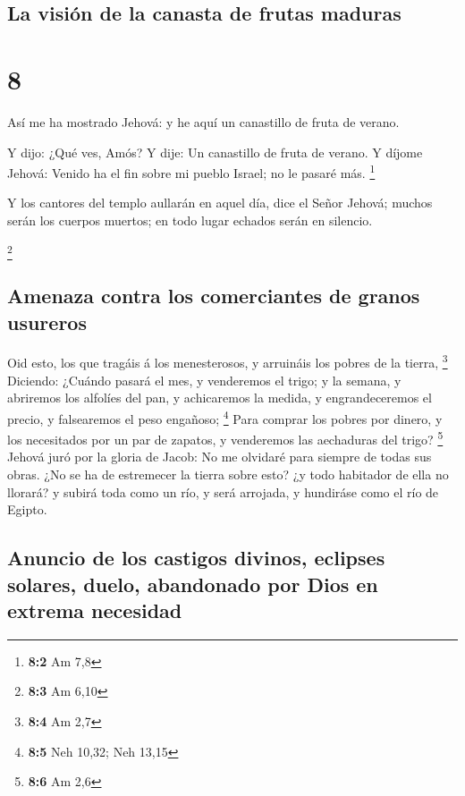 \hypertarget{la-visiuxf3n-de-la-canasta-de-frutas-maduras}{%
\subsection{La visión de la canasta de frutas
maduras}\label{la-visiuxf3n-de-la-canasta-de-frutas-maduras}}

\hypertarget{section-7}{%
\section{8}\label{section-7}}

 Así me ha mostrado Jehová: y he aquí un canastillo de fruta
de verano.

 Y dijo: ¿Qué ves, Amós? Y dije: Un canastillo de fruta de
verano. Y díjome Jehová: Venido ha el fin sobre mi pueblo Israel; no le
pasaré más. \footnote{\textbf{8:2} Am 7,8}

 Y los cantores del templo aullarán en aquel día, dice el
Señor Jehová; muchos serán los cuerpos muertos; en todo lugar echados
serán en silencio.

\footnote{\textbf{8:3} Am 6,10}

\hypertarget{amenaza-contra-los-comerciantes-de-granos-usureros}{%
\subsection{Amenaza contra los comerciantes de granos
usureros}\label{amenaza-contra-los-comerciantes-de-granos-usureros}}

 Oid esto, los que tragáis á los menesterosos, y arruináis
los pobres de la tierra, \footnote{\textbf{8:4} Am 2,7} 
Diciendo: ¿Cuándo pasará el mes, y venderemos el trigo; y la semana, y
abriremos los alfolíes del pan, y achicaremos la medida, y
engrandeceremos el precio, y falsearemos el peso engañoso; \footnote{\textbf{8:5}
  Neh 10,32; Neh 13,15}  Para comprar los pobres por dinero,
y los necesitados por un par de zapatos, y venderemos las aechaduras del
trigo? \footnote{\textbf{8:6} Am 2,6}  Jehová juró por la
gloria de Jacob: No me olvidaré para siempre de todas sus obras.
 ¿No se ha de estremecer la tierra sobre esto? ¿y todo
habitador de ella no llorará? y subirá toda como un río, y será
arrojada, y hundiráse como el río de Egipto.

\hypertarget{anuncio-de-los-castigos-divinos-eclipses-solares-duelo-abandonado-por-dios-en-extrema-necesidad}{%
\subsection{Anuncio de los castigos divinos, eclipses solares, duelo,
abandonado por Dios en extrema
necesidad}\label{anuncio-de-los-castigos-divinos-eclipses-solares-duelo-abandonado-por-dios-en-extrema-necesidad}}

